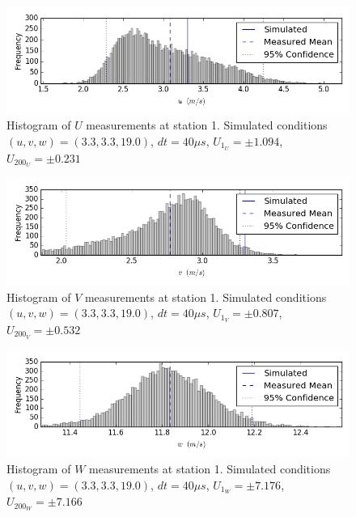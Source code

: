 \begin{figure}[H]
\centering
\includegraphics[width=6in]{figs/Ely_May28th01002/uncertainty_Ely_May28th01002_U}
\caption{Histogram of $U$ measurements at station 1. Simulated conditions $(u,v,w)=(3.3, 3.3, 19.0)$, $dt=40 \mu s$, $U_1_U=\pm 1.094$, $U_200_U=\pm 0.231$}
\label{fig:uncertainty_Ely_May28th01002_U}
\end{figure}


\begin{figure}[H]
\centering
\includegraphics[width=6in]{figs/Ely_May28th01002/uncertainty_Ely_May28th01002_V}
\caption{Histogram of $V$ measurements at station 1. Simulated conditions $(u,v,w)=(3.3, 3.3, 19.0)$, $dt=40 \mu s$, $U_1_V=\pm 0.807$, $U_200_V=\pm 0.532$}
\label{fig:uncertainty_Ely_May28th01002_V}
\end{figure}


\begin{figure}[H]
\centering
\includegraphics[width=6in]{figs/Ely_May28th01002/uncertainty_Ely_May28th01002_W}
\caption{Histogram of $W$ measurements at station 1. Simulated conditions $(u,v,w)=(3.3, 3.3, 19.0)$, $dt=40 \mu s$, $U_1_W=\pm 7.176$, $U_200_W=\pm 7.166$}
\label{fig:uncertainty_Ely_May28th01002_W}
\end{figure}


